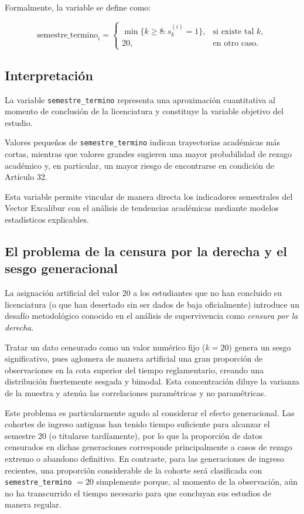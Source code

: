 Formalmente, la variable se define como:

\[
\text{semestre\_termino}_i =
\begin{cases}
\min \{ k \geq 8 : s_k^{(i)} = 1 \}, & \text{si existe tal } k, \\
20, & \text{en otro caso}.
\end{cases}
\]

\subsection{Interpretación}

La variable \texttt{semestre\_termino} representa una aproximación cuantitativa al momento de
conclusión de la licenciatura y constituye la variable objetivo del estudio.

Valores pequeños de \texttt{semestre\_termino} indican trayectorias académicas más cortas,
mientras que valores grandes sugieren una mayor probabilidad de rezago académico y, en
particular, un mayor riesgo de encontrarse en condición de Artículo 32.

Esta variable permite vincular de manera directa los indicadores semestrales del Vector
Excalibur con el análisis de tendencias académicas mediante modelos estadísticos explicables.

\subsection{El problema de la censura por la derecha y el sesgo generacional}

La asignación artificial del valor 20 a los estudiantes que no han concluido su licenciatura (o que han desertado sin ser dados de baja oficialmente) introduce un desafío metodológico conocido en el análisis de supervivencia como \textit{censura por la derecha}.

Tratar un dato censurado como un valor numérico fijo ($k=20$) genera un sesgo significativo, pues aglomera de manera artificial una gran proporción de observaciones en la cota superior del tiempo reglamentario, creando una distribución fuertemente sesgada y bimodal. Esta concentración diluye la varianza de la muestra y atenúa las correlaciones paramétricas y no paramétricas.

Este problema es particularmente agudo al considerar el efecto generacional. Las cohortes de ingreso antiguas han tenido tiempo suficiente para alcanzar el semestre 20 (o titularse tardíamente), por lo que la proporción de datos censurados en dichas generaciones corresponde principalmente a casos de rezago extremo o abandono definitivo. En contraste, para las generaciones de ingreso recientes, una proporción considerable de la cohorte será clasificada con \texttt{semestre\_termino} $= 20$ simplemente porque, al momento de la observación, aún no ha transcurrido el tiempo necesario para que concluyan sus estudios de manera regular. 

